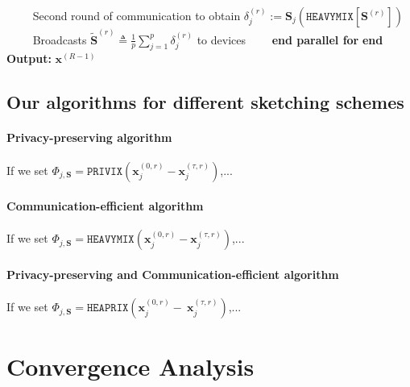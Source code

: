 \begin{algorithm}[H]
\begin{algorithmic}[1]
\State $\qquad$ Second round of communication to obtain $\delta_j^{(r)} :=  \mathbf{S}_j\left(\texttt{HEAVYMIX}[\mathbf{S}^{(r)}]\right)$ 
\State $\qquad$ Broadcasts $\tilde{\mathbf{S}}^{(r)}\triangleq\frac{1}{p}\sum_{j=1}^p\delta_j^{(r)}$ to devices
\State $\qquad$\textbf{end parallel for}
\State \textbf{end}
\State \textbf{Output:} ${\boldsymbol{x}}^{(R-1)}$
\vspace{- 0.1cm}
\end{algorithmic}
\end{algorithm}


\subsection{Our algorithms for different sketching schemes}
\paragraph{Privacy-preserving algorithm}
If we set  $\Phi_{j,\mathbf{S}}=\texttt{PRIVIX}\left(\boldsymbol{x}_j^{(0,r)}-\boldsymbol{x}_j^{(\tau,r)}\right)$,...

\paragraph{Communication-efficient algorithm}
If we set  $\Phi_{j,\mathbf{S}}=\texttt{HEAVYMIX}\left(\boldsymbol{x}_j^{(0,r)}-\boldsymbol{x}_j^{(\tau,r)}\right)$,...
\paragraph{Privacy-preserving and Communication-efficient algorithm}
If we set  $\Phi_{j,\mathbf{S}}=\texttt{HEAPRIX}\left(\boldsymbol{x}_j^{(0,r)}-~{\boldsymbol{x}}_{j}^{(\tau,r)}\right)$,...








\section{Convergence Analysis}

